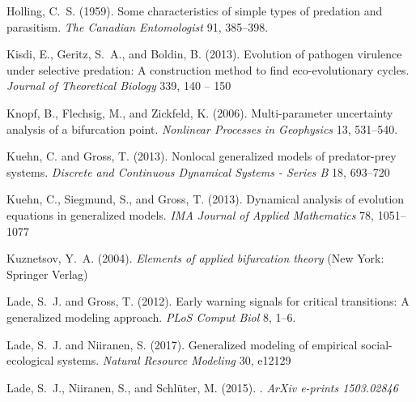 \documentclass{article}
\begin{document}
\begin{thebibliography}{85}
Holling, C.~S. (1959).
\newblock Some characteristics of simple types of predation and parasitism.
\newblock \emph{The Canadian Entomologist} 91, 385--398.
\newblock {}

Kisdi, E., Geritz, S.~A., and Boldin, B. (2013).
\newblock Evolution of pathogen virulence under selective predation: A
  construction method to find eco-evolutionary cycles.
\newblock \emph{Journal of Theoretical Biology} 339, 140 -- 150

Knopf, B., Flechsig, M., and Zickfeld, K. (2006).
\newblock Multi-parameter uncertainty analysis of a bifurcation point.
\newblock \emph{Nonlinear Processes in Geophysics} 13, 531--540.
\newblock {}

Kuehn, C. and Gross, T. (2013).
\newblock Nonlocal generalized models of predator-prey systems.
\newblock \emph{Discrete and Continuous Dynamical Systems - Series B} 18,
  693--720

Kuehn, C., Siegmund, S., and Gross, T. (2013).
\newblock Dynamical analysis of evolution equations in generalized models.
\newblock \emph{IMA Journal of Applied Mathematics} 78, 1051--1077

Kuznetsov, Y.~A. (2004).
\newblock \emph{Elements of applied bifurcation theory} (New York: Springer
  Verlag)

Lade, S.~J. and Gross, T. (2012).
\newblock Early warning signals for critical transitions: A generalized
  modeling approach.
\newblock \emph{PLoS Comput Biol} 8, 1--6.
\newblock {}

Lade, S.~J. and Niiranen, S. (2017).
\newblock Generalized modeling of empirical social-ecological systems.
\newblock \emph{Natural Resource Modeling} 30, e12129

{Lade}, S.~J., {Niiranen}, S., and {Schl{\"u}ter}, M. (2015).
.
\newblock \emph{ArXiv e-prints 1503.02846}


\end{thebibliography}
\end{document}
